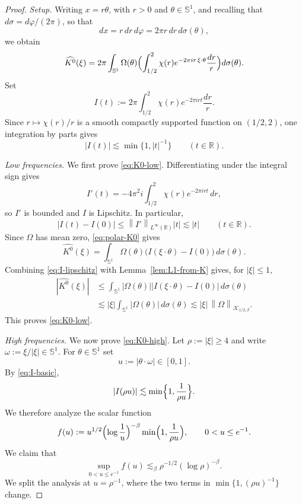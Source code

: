 \documentclass[11pt]{amsart}
\theoremstyle{remark}
\numberwithin{equation}{section}
\newcommand{\R}{\mathbb R}
\newcommand{\Sph}{\mathbb S^1}
\newcommand{\cK}{\mathcal K}
\newcommand{\norm}[1]{\left\lVert #1\right\rVert}
\newcommand{\abs}[1]{\left\lvert #1\right\rvert}
\begin{document}
	\begin{proof}
		\emph{Setup.}
		Writing \(x=r\theta\), with \(r>0\) and \(\theta\in\Sph\), and recalling that
		\(d\sigma=d\varphi/(2\pi)\), so that
		\[
		dx=r\,dr\,d\varphi=2\pi r\,dr\,d\sigma(\theta),
		\]
		we obtain
		\begin{equation}\label{eq:polar-K0}
			\widehat{K^0}(\xi)
			=
			2\pi\int_{\Sph}\Omega(\theta)
			\Bigl(\int_{1/2}^{2}\chi(r)e^{-2\pi i r\,\xi\cdot\theta}\frac{dr}{r}\Bigr)
			d\sigma(\theta).
		\end{equation}
		Set
		\[
		I(t):=2\pi\int_{1/2}^{2}\chi(r)e^{-2\pi i rt}\frac{dr}{r}.
		\]
		Since \(r\mapsto \chi(r)/r\) is a smooth compactly supported function on \((1/2,2)\), one integration by parts gives
		\begin{equation}\label{eq:I-basic}
			\abs{I(t)}\lesssim \min\{1,\abs{t}^{-1}\}
			\qquad (t\in\R).
		\end{equation}
		
		\smallskip
		\noindent\emph{Low frequencies.}
		We first prove \eqref{eq:K0-low}. Differentiating under the integral sign gives
		\[
		I'(t)=-4\pi^2 i\int_{1/2}^{2}\chi(r)e^{-2\pi i rt}\,dr,
		\]
		so \(I'\) is bounded and \(I\) is Lipschitz. In particular,
		\begin{equation}\label{eq:I-lipschitz}
			\abs{I(t)-I(0)}\le \norm{I'}_{L^\infty(\R)}\abs{t}\lesssim \abs{t}
			\qquad (t\in\R).
		\end{equation}
		Since \(\Omega\) has mean zero, \eqref{eq:polar-K0} gives
		\[
		\widehat{K^0}(\xi)=\int_{\Sph}\Omega(\theta)\bigl(I(\xi\cdot\theta)-I(0)\bigr)\,d\sigma(\theta).
		\]
		Combining \eqref{eq:I-lipschitz} with Lemma~\ref{lem:L1-from-K} gives, for
		\(\abs{\xi}\le1\),
		\begin{align*}
			\abs{\widehat{K^0}(\xi)}
			&\le
			\int_{\Sph}\abs{\Omega(\theta)}\abs{I(\xi\cdot\theta)-I(0)}\,d\sigma(\theta)
			\\
			&\lesssim
			\abs{\xi}\int_{\Sph}\abs{\Omega(\theta)}\,d\sigma(\theta)
			\lesssim
			\abs{\xi}\,\norm{\Omega}_{\cK_{1/2,\beta}}.
		\end{align*}
		This proves \eqref{eq:K0-low}.
		
		\smallskip
		\noindent\emph{High frequencies.}
		We now prove \eqref{eq:K0-high}. Let \(\rho:=\abs{\xi}\ge4\) and write \(\omega:=\xi/\abs{\xi}\in\Sph\). For \(\theta\in\Sph\) set
		\[
		u:=\abs{\theta\cdot\omega}\in[0,1].
		\]
		By \eqref{eq:I-basic},
		\[
		\abs{I(\rho u)}\lesssim \min\Bigl\{1,\frac1{\rho u}\Bigr\}.
		\]
		We therefore analyze the scalar function
		\begin{equation}\label{eq:def-f}
			f(u):=u^{1/2}\Bigl(\log\frac1u\Bigr)^{-\beta}
			\min\Bigl(1,\frac1{\rho u}\Bigr),
			\qquad 0<u\le e^{-1}.
		\end{equation}
		We claim that
		\begin{equation}\label{eq:f-max}
			\sup_{0<u\le e^{-1}}f(u)
			\lesssim_\beta
			\rho^{-1/2}(\log\rho)^{-\beta}.
		\end{equation}
		We split the analysis at \(u=\rho^{-1}\), where the two terms in
		\(\min\{1,(\rho u)^{-1}\}\) change.
		

\end{proof}
\end{document}
